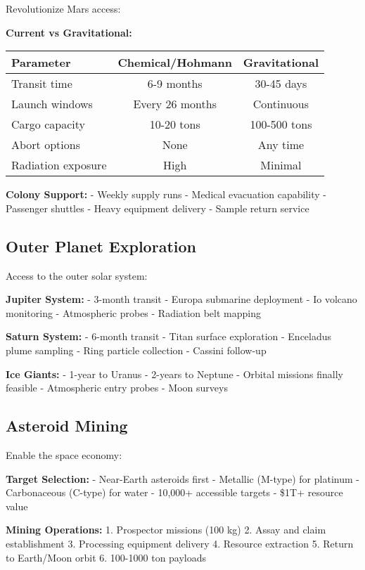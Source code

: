 \documentclass[12pt,letterpaper]{book}
\theoremstyle{definition}
\theoremstyle{plain}
\theoremstyle{remark}
\begin{document}
{{{{{Revolutionize Mars access:

\textbf{Current vs Gravitational:}
\begin{table}[h]
\centering
\begin{tabular}{lcc}
\toprule
Parameter & Chemical/Hohmann & Gravitational \\
\midrule
Transit time & 6-9 months & 30-45 days \\
Launch windows & Every 26 months & Continuous \\
Cargo capacity & 10-20 tons & 100-500 tons \\
Abort options & None & Any time \\
Radiation exposure & High & Minimal \\
\bottomrule
\end{tabular}
\end{table}

\textbf{Colony Support:}
- Weekly supply runs
- Medical evacuation capability
- Passenger shuttles
- Heavy equipment delivery
- Sample return service

\subsection{Outer Planet Exploration}

Access to the outer solar system:

\textbf{Jupiter System:}
- 3-month transit
- Europa submarine deployment
- Io volcano monitoring
- Atmospheric probes
- Radiation belt mapping

\textbf{Saturn System:}
- 6-month transit
- Titan surface exploration
- Enceladus plume sampling
- Ring particle collection
- Cassini follow-up

\textbf{Ice Giants:}
- 1-year to Uranus
- 2-years to Neptune
- Orbital missions finally feasible
- Atmospheric entry probes
- Moon surveys

\subsection{Asteroid Mining}

Enable the space economy:

\textbf{Target Selection:}
- Near-Earth asteroids first
- Metallic (M-type) for platinum
- Carbonaceous (C-type) for water
- 10,000+ accessible targets
- \$1T+ resource value

\textbf{Mining Operations:}
1. Prospector missions (100 kg)
2. Assay and claim establishment
3. Processing equipment delivery
4. Resource extraction
5. Return to Earth/Moon orbit
6. 100-1000 ton payloads

}}}}}
\end{document}
